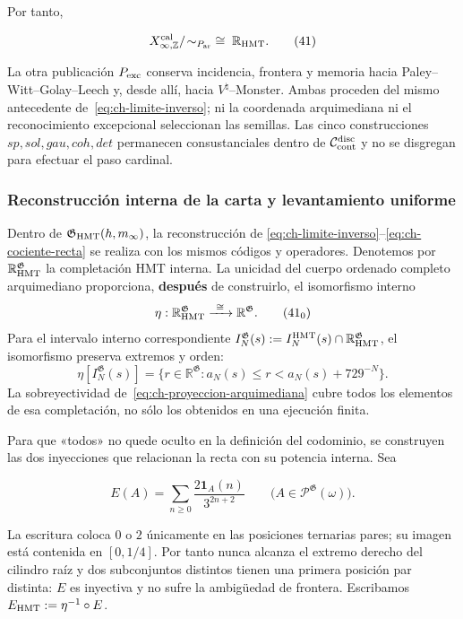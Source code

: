 Por tanto,

\[
 X_{\infty,\mathbb Z}^{\rm cal}/\!\sim_{P_{\rm ar}}
 \;\cong\;\mathbb R_{\rm HMT}.
\tag{41}\label{eq:ch-cociente-recta}
\]

La otra publicación \(P_{\rm exc}\) conserva incidencia, frontera y memoria
hacia Paley--Witt--Golay--Leech y, desde allí, hacia
\(V^\natural\)--Monster. Ambas proceden del
mismo antecedente de~\eqref{eq:ch-limite-inverso}; ni la coordenada arquimediana ni el reconocimiento
excepcional seleccionan las semillas. Las cinco construcciones
\(sp,sol,gau,coh,det\) permanecen consustanciales dentro de
\(\mathcal C_{\rm cont}^{\rm disc}\) y no se disgregan para efectuar el paso
cardinal.



\subsubsection{Reconstrucción interna de la carta y levantamiento uniforme}

Dentro de \(\mathfrak G_{\rm HMT}(h,m_\infty)\), la reconstrucción de
\eqref{eq:ch-limite-inverso}--\eqref{eq:ch-cociente-recta} se realiza con los mismos códigos y operadores. Denotemos por
\(\mathbb R_{\rm HMT}^{\mathfrak G}\) la completación HMT interna. La
unicidad del cuerpo ordenado completo arquimediano proporciona, \textbf{después} de
construirlo, el isomorfismo interno
\[
 \eta:\mathbb R_{\rm HMT}^{\mathfrak G}
 \xrightarrow{\ \cong\ }\mathbb R^{\mathfrak G}.
\tag{41$_0$}\label{eq:ch-isomorfismo-interno}
\]
Para el intervalo interno correspondiente
\(I_N^{\mathfrak G}(s):=
 I_N^{\rm HMT}(s)\cap\mathbb R_{\rm HMT}^{\mathfrak G}\), el isomorfismo
preserva extremos y orden:
\[
 \eta[I_N^{\mathfrak G}(s)]
 =\{r\in\mathbb R^{\mathfrak G}:
      a_N(s)\le r<a_N(s)+729^{-N}\}.
\tag{41$_0$a}\label{eq:ch-intervalos-internos}
\]
La sobreyectividad de~\eqref{eq:ch-proyeccion-arquimediana} cubre todos los elementos de esa completación, no
sólo los obtenidos en una ejecución finita.

Para que «todos» no quede oculto en la definición del codominio, se construyen
las dos inyecciones que relacionan la recta con su potencia interna. Sea

\[
 E(A)=\sum_{n\ge0}\frac{2\mathbf1_A(n)}{3^{2n+2}}
 \qquad
 \bigl(A\in\mathcal P^{\mathfrak G}(\omega)\bigr).
\tag{41a}\label{eq:ch-incrustacion-cantor}
\]

La escritura coloca \(0\) o \(2\) únicamente en las posiciones ternarias
pares; su imagen está contenida en \([0,1/4]\). Por tanto nunca alcanza el
extremo derecho del cilindro raíz y dos subconjuntos distintos tienen una
primera posición par distinta: \(E\) es inyectiva y no sufre la ambigüedad de
frontera. Escribamos \(E_{\rm HMT}:=\eta^{-1}\circ E\).

